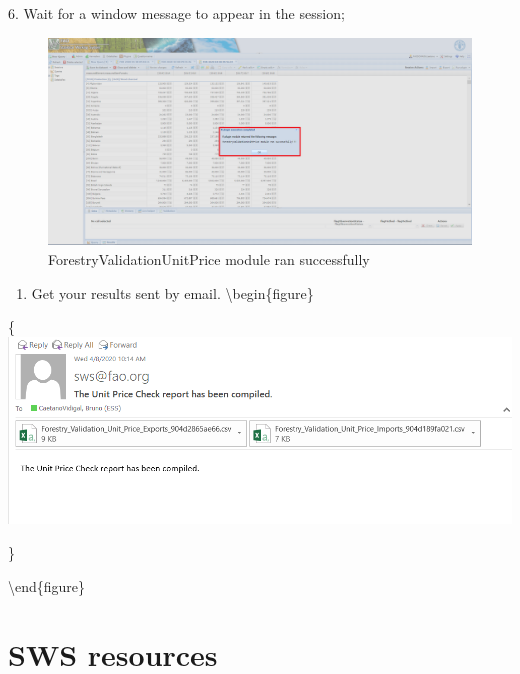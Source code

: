 \documentclass[
]{book}
\providecommand{\tightlist}{%
  \setlength{\itemsep}{0pt}\setlength{\parskip}{0pt}}
\begin{document}
6. Wait for a window message to appear in the session;

\begin{figure}

{\centering \includegraphics[width=1\linewidth]{images/result_unit_price_plugin} 

}

\caption{ForestryValidationUnitPrice module ran successfully}\label{fig:UnitPricePluginResults}
\end{figure}

\begin{enumerate}
\def\labelenumi{\arabic{enumi}.}
\setcounter{enumi}{6}
\tightlist
\item
  Get your results sent by email.
  \textbackslash begin\{figure\}
\end{enumerate}

\{\centering \includegraphics[width=0.8\linewidth]{images/unit_price_email_sent}

\}

\caption{Email sent to the user with results}

\label{fig:UnitPricePluginEmail}
\textbackslash end\{figure\}

\hypertarget{appendix-appendix}{%
\appendix}


\hypertarget{sws-resources}{%
\chapter{SWS resources}\label{sws-resources}}
\end{document}
